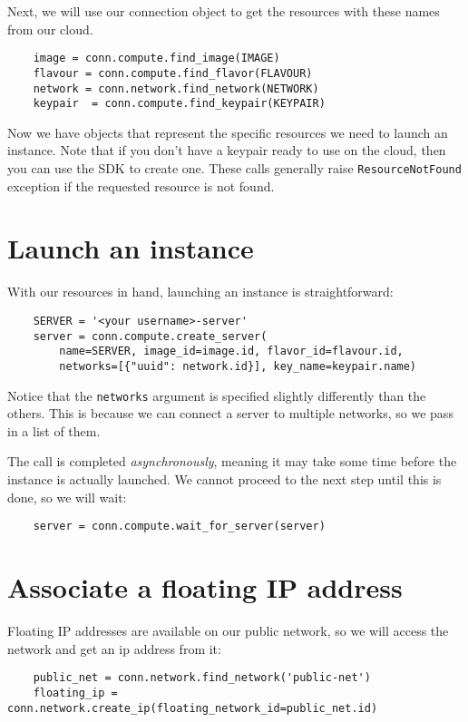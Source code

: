 \documentclass{article}
\begin{document}
\newpage

Next, we will use our connection object to get the resources with these names from our cloud.

\begin{verbatim}
    image = conn.compute.find_image(IMAGE)
    flavour = conn.compute.find_flavor(FLAVOUR)
    network = conn.network.find_network(NETWORK)
    keypair  = conn.compute.find_keypair(KEYPAIR)
\end{verbatim}

Now we have objects that represent the specific resources we need to launch an instance. Note that if you don't have a keypair ready to use on the cloud, then you can use the SDK to create one. These calls generally raise \texttt{ResourceNotFound} exception if the requested resource is not found.

\section{Launch an instance}
With our resources in hand, launching an instance is straightforward:

\begin{verbatim}
    SERVER = '<your username>-server'
    server = conn.compute.create_server(
        name=SERVER, image_id=image.id, flavor_id=flavour.id,
        networks=[{"uuid": network.id}], key_name=keypair.name) 
\end{verbatim}

Notice that the \texttt{networks} argument is specified slightly differently than the others. This is because we can connect a server to multiple networks, so we pass in a list of them.

The call is completed \emph{asynchronously}, meaning it may take some time before the instance is actually launched. We cannot proceed to the next step until this is done, so we will wait:

\begin{verbatim}
    server = conn.compute.wait_for_server(server)
\end{verbatim}


\section{Associate a floating IP address}
Floating IP addresses are available on our public network, so we will access the network and get an ip address from it:

\begin{verbatim}
    public_net = conn.network.find_network('public-net')
    floating_ip = conn.network.create_ip(floating_network_id=public_net.id) 
\end{verbatim}
\end{document}
